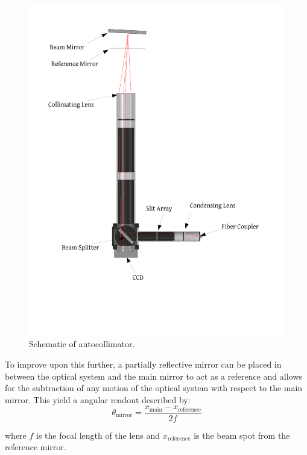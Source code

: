 \documentclass [12pt, proquest]{uwthesis}[2019]
\begin{document}
\begin{figure}%
\begin{center}
 \includegraphics[width=\textwidth]{Autocollimator.pdf}
\caption{Schematic of autocollimator.}
\label{ACFig}
\end{center}
\end{figure}

To improve upon this further, a partially reflective mirror can be placed in between the optical system and the main mirror to act as a reference and allows for the subtraction of any motion of the optical system with respect to the main mirror. This yield a angular readout described by:
\begin{equation}
\theta_{\text{mirror}}=\frac{x_{\text{main}}-x_{\text{reference}}}{2f}
\label{ACEq}
\end{equation}

where $f$ is the focal length of the lens and $x_\text{reference}$ is the beam spot from the reference mirror.
\end{document}
